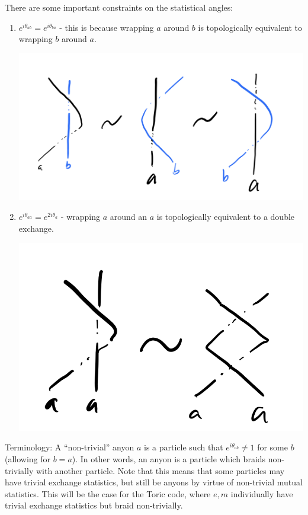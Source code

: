 There are some important constraints on the statistical angles:
\begin{enumerate}
    \item $e^{i\theta_{ab}} = e^{i\theta_{ba}}$ - this is because wrapping $a$ around $b$ is topologically equivalent to wrapping $b$ around $a$.
    \begin{center}
        \includegraphics[scale=0.35]{Lectures/Images/lec5-mutualrelation.png}
    \end{center}
    \item $e^{i\theta_{aa}} = e^{2i\theta_a}$ - wrapping $a$ around an $a$ is topologically equivalent to a double exchange.
    \begin{center}
        \includegraphics[scale=0.35]{Lectures/Images/lec5-exchangerelation.png}
    \end{center}
\end{enumerate}
Terminology: A ``non-trivial'' anyon $a$ is a particle such that $e^{i\theta_{ab}} \neq 1$ for some $b$ (allowing for $b = a$). In other words, an anyon is a particle which braids non-trivially with another particle. Note that this means that some particles may have trivial exchange statistics, but still be anyons by virtue of non-trivial mutual statistics. This will be the case for the Toric code, where $e, m$ individually have trivial exchange statistics but braid non-trivially.

